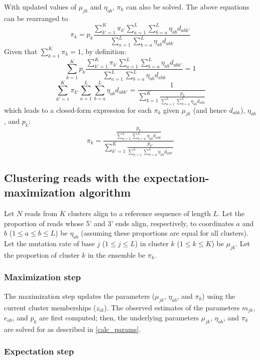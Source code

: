 \documentclass[main.tex]{subfiles}
\begin{document}
With updated values of $\mu_{jk}$ and $\eta_{ab}$, $\pi_k$ can also be solved.
The above equations can be rearranged to
$$\pi_k = p_k \frac{\sum_{k'=1}^{K} \pi_{k'} \sum_{a=1}^{L} \sum_{b=a}^{L} \eta_{ab} d_{abk'}}{\sum_{a=1}^{L} \sum_{b=a}^{L} \eta_{ab} d_{abk}}$$
Given that $\sum_{k=1}^{K} \pi_k = 1$, by definition:
$$\sum_{k=1}^{K} p_k \frac{\sum_{k'=1}^{K} \pi_{k'} \sum_{a=1}^{L} \sum_{b=a}^{L} \eta_{ab} d_{abk'}}{\sum_{a=1}^{L} \sum_{b=a}^{L} \eta_{ab} d_{abk}} = 1$$
$$\sum_{k'=1}^{K} \pi_{k'} \sum_{a=1}^{L} \sum_{b=a}^{L} \eta_{ab} d_{abk'} = \frac{1}{\sum_{k=1}^{K} \frac{p_k}{\sum_{a=1}^{L} \sum_{b=a}^{L} \eta_{ab} d_{abk}}}$$
which leads to a closed-form expression for each $\pi_k$ given $\mu_{jk}$ (and hence $d_{abk}$), $\eta_{ab}$, and $p_k$:
$$\pi_k = \frac{\frac{p_k}{ \sum_{a=1}^{L} \sum_{b=a}^{L} \eta_{ab} d_{abk}}}{\sum_{k'=1}^{K} \frac{p_{k'}}{\sum_{a=1}^{L} \sum_{b=a}^{L} \eta_{ab} d_{abk'}}}$$


\subsection{Clustering reads with the expectation-maximization algorithm}

Let $N$ reads from $K$ clusters align to a reference sequence of length $L$.
Let the proportion of reads whose 5' and 3' ends align, respectively, to coordinates $a$ and $b$ ($1 \le a \le b \le L$) be $\eta_{ab}$ (assuming these proportions are equal for all clusters).
Let the mutation rate of base $j$ ($1 \le j \le L$) in cluster $k$ ($1 \le k \le K$) be $\mu_{jk}$.
Let the proportion of cluster $k$ in the ensemble be $\pi_k$.

\subsubsection{Maximization step}

The maximization step updates the parameters ($\mu_{jk}$, $\eta_{ab}$, and $\pi_k$) using the current cluster memberships ($z_{ik}$).
The observed estimates of the parameters $m_{jk}$, $e_{ab}$, and $p_k$ are first computed; then, the underlying parameters $\mu_{jk}$, $\eta_{ab}$, and $\pi_k$ are solved for as described in \ref{calc_params}.

\subsubsection{Expectation step}
\end{document}
